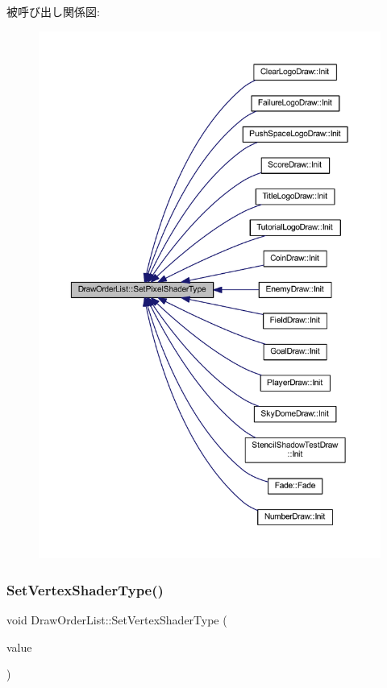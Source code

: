 被呼び出し関係図\+:\nopagebreak
\begin{figure}[H]
\begin{center}
\leavevmode
\includegraphics[width=350pt]{class_draw_order_list_a0fd7f50f4078001983f88014d59f8f29_icgraph}
\end{center}
\end{figure}
\mbox{\label{class_draw_order_list_a1c2d881dd0d31f1c7cde4494f7c38481}} 
\subsubsection{\texorpdfstring{Set\+Vertex\+Shader\+Type()}{SetVertexShaderType()}}
{\footnotesize\ttfamily void Draw\+Order\+List\+::\+Set\+Vertex\+Shader\+Type (\begin{DoxyParamCaption}\item[{\mbox{\hyperlink{class_shader_manager_a9b51e49d70eb3cc58f6d1f3994e8cfbd}{Shader\+Manager\+::\+Vertex\+Shader\+Type}}}]{value }\end{DoxyParamCaption})\hspace{0.3cm}{\ttfamily [inline]}}



